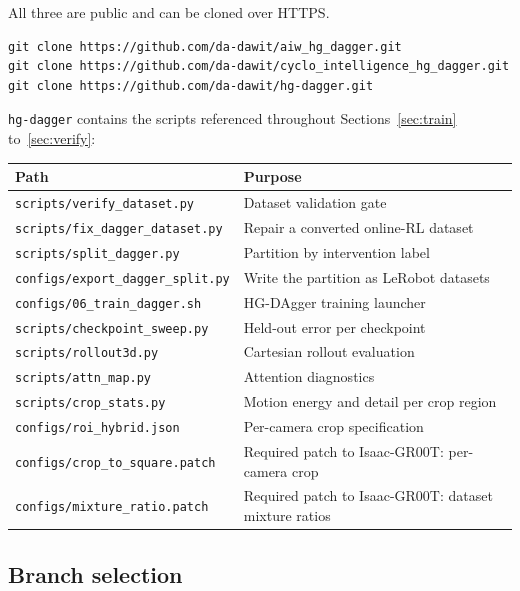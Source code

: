 \documentclass[11pt,a4paper]{article}
\begin{document}
All three are public and can be cloned over HTTPS.

\begin{lstlisting}[style=sh]
git clone https://github.com/da-dawit/aiw_hg_dagger.git
git clone https://github.com/da-dawit/cyclo_intelligence_hg_dagger.git
git clone https://github.com/da-dawit/hg-dagger.git
\end{lstlisting}

\texttt{hg-dagger} contains the scripts referenced throughout
Sections~\ref{sec:train} to~\ref{sec:verify}:

\begin{center}
\small
\begin{tabular}{@{}ll@{}}
\toprule
\textbf{Path} & \textbf{Purpose}\\
\midrule
\texttt{scripts/verify\_dataset.py}      & Dataset validation gate\\
\texttt{scripts/fix\_dagger\_dataset.py} & Repair a converted online-RL dataset\\
\texttt{scripts/split\_dagger.py}        & Partition by intervention label\\
\texttt{configs/export\_dagger\_split.py}& Write the partition as LeRobot datasets\\
\texttt{configs/06\_train\_dagger.sh}    & HG-DAgger training launcher\\
\texttt{scripts/checkpoint\_sweep.py}    & Held-out error per checkpoint\\
\texttt{scripts/rollout3d.py}            & Cartesian rollout evaluation\\
\texttt{scripts/attn\_map.py}            & Attention diagnostics\\
\texttt{scripts/crop\_stats.py}          & Motion energy and detail per crop region\\
\texttt{configs/roi\_hybrid.json}        & Per-camera crop specification\\
\texttt{configs/crop\_to\_square.patch}  & Required patch to Isaac-GR00T: per-camera crop\\
\texttt{configs/mixture\_ratio.patch}    & Required patch to Isaac-GR00T: dataset mixture ratios\\
\bottomrule
\end{tabular}
\end{center}

\subsection{Branch selection}
\end{document}
